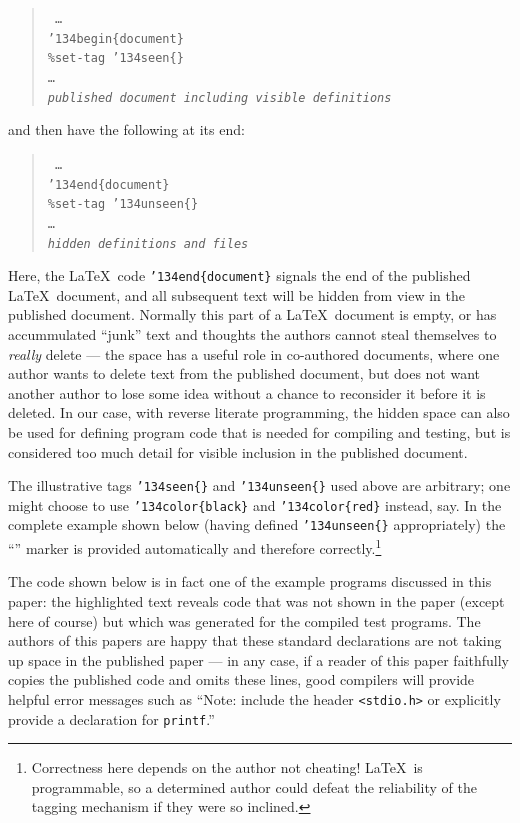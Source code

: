 \documentclass[12pt]{article}
\begin{document}
\begin{verse}\tt
\ldots \\
\char'134begin\{document\}\\
\%{}set-tag \char'134seen\{\} \\
\ldots \\
\emph{published document including visible definitions}
\end{verse}

and then have the following at its end:

\begin{verse}\tt
\ldots\\
\char'134end\{document\} \\
\%{}set-tag \char'134unseen\{\} \\
\ldots\\
\emph{hidden definitions and files}
\end{verse}

Here, the \LaTeX\ code \texttt{\char'134end\{document\}} signals the end of the published \LaTeX\ document, and all subsequent text will be hidden from view in the published document. Normally this part of a \LaTeX\ document is empty, or has accummulated ``junk'' text and thoughts the authors cannot steal themselves to \emph{really\/} delete --- the space has a useful role in co-authored documents, where one author wants to delete text from the published document, but does not want another author to lose some idea without a chance to reconsider it before it is deleted. In our case, with reverse literate programming, the hidden space can also be used for defining program code that is needed for compiling and testing, but is considered too much detail for visible inclusion in the published document.

The illustrative tags \texttt{\char'134seen\{\}} and \texttt{\char'134unseen\{\}} used above are arbitrary; one might choose to use \texttt{\char'134color\{black\}} and \texttt{\char'134color\{red\}} instead, say. In the complete example shown below (having defined \texttt{\char'134unseen\{\}} appropriately)  the ``{\hidden}'' marker is provided automatically and therefore correctly.\footnote{Correctness here depends on the author not cheating! \LaTeX\ is programmable, so a determined author could defeat the reliability of the tagging mechanism if they were so inclined.}

The code shown below is in fact one of the example programs discussed in this paper: the highlighted text reveals code that was not shown in the paper (except here of course) but which was generated for the compiled test programs. The authors of this papers are happy that these standard declarations are not taking up space in the published paper --- in any case, if a reader of this paper faithfully copies the published code and omits these lines, good compilers will provide helpful error messages such as ``Note: include the header \texttt{<stdio.h>} or explicitly provide a declaration for \texttt{printf}.''
\end{document}
